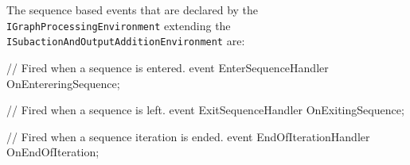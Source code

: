 The sequence based events that are declared by the \texttt{IGraph\-Processing\-Environment} extending the \texttt{ISubaction\-And\-Output\-Addition\-Environment} are:

\begin{csharplet}
// Fired when a sequence is entered.
event EnterSequenceHandler OnEntereringSequence;

// Fired when a sequence is left.
event ExitSequenceHandler OnExitingSequence;

// Fired when a sequence iteration is ended.
event EndOfIterationHandler OnEndOfIteration;
\end{csharplet}
